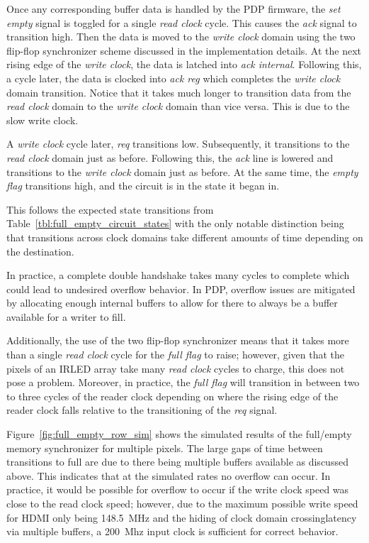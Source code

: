         Once any corresponding buffer data is handled by the PDP firmware, the {\it set empty} signal is toggled for a single {\it read clock} cycle. This causes the {\it ack} signal to transition high. Then the data is moved to the {\it write clock} domain using the two flip-flop synchronizer scheme discussed in the implementation details. At the next rising edge of the {\it write clock}, the data is latched into {\it ack internal}. Following this, a cycle later, the data is clocked into {\it ack reg} which completes the {\it write clock} domain transition. Notice that it takes much longer to transition data from the {\it read clock} domain to the {\it write clock} domain than vice versa. This is due to the slow write clock.

        A {\it write clock} cycle later, {\it req} transitions low. Subsequently, it transitions to the {\it read clock} domain just as before. Following this, the {\it ack} line is lowered and transitions to the {\it write clock} domain just as before. At the same time, the {\it empty flag} transitions high, and the circuit is in the state it began in.

        This follows the expected state transitions from Table~\ref{tbl:full_empty_circuit_states} with the only notable distinction being that transitions across clock domains take different amounts of time depending on the destination.

        In practice, a complete double handshake takes many cycles to complete which could lead to undesired overflow behavior. In PDP, overflow issues are mitigated by allocating enough internal buffers to allow for there to always be a buffer available for a writer to fill.

        Additionally, the use of the two flip-flop synchronizer means that it takes more than a single {\it read clock} cycle for the {\it full flag} to raise; however, given that the pixels of an IRLED array take many {\it read clock} cycles to charge, this does not pose a problem. Moreover, in practice, the {\it full flag} will transition in between two to three cycles of the reader clock depending on where the rising edge of the reader clock falls relative to the transitioning of the {\it req} signal.

        Figure~\ref{fig:full_empty_row_sim} shows the simulated results of the full/empty memory synchronizer for multiple pixels. The large gaps of time between transitions to full are due to there being multiple buffers available as discussed above. This indicates that at the simulated rates no overflow can occur. In practice, it would be possible for overflow to occur if the write clock speed was close to the read clock speed; however, due to the maximum possible write speed for HDMI only being \mbox{148.5 MHz} and the hiding of clock domain crossinglatency via multiple buffers, a \mbox{200 Mhz} input clock is sufficient for correct behavior.


